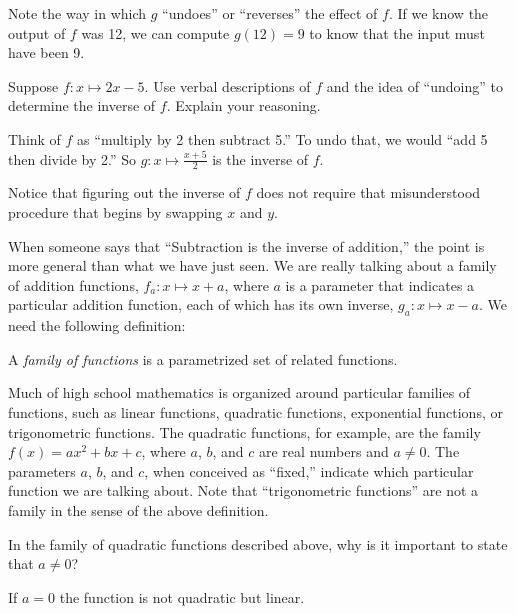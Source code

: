 \documentclass[space,handout,nooutcomes]{ximera}
\begin{document}
Note the way in which $g$ ``undoes'' or ``reverses'' the effect of $f$.  If we know the output of $f$ was 12, we can compute $g(12)=9$ to know that the input must have been 9.  

\begin{question}
Suppose $f:x\mapsto 2x-5$.  Use verbal descriptions of $f$ and the idea of ``undoing'' to determine the inverse of $f$.  Explain your reasoning.  
\begin{freeResponse}
\begin{hint}
Think of $f$ as ``multiply by 2 then subtract 5.'' To undo that, we would ``add 5 then divide by 2.''  So $g:x\mapsto \frac{x+5}{2}$ is the inverse of $f$.  
\end{hint}
\end{freeResponse}
\end{question}

\begin{remark}
Notice that figuring out the inverse of $f$ does not require that misunderstood procedure that begins by swapping $x$ and $y$.  
\end{remark}

When someone says that ``Subtraction is the inverse of addition,'' the point is more general than what we have just seen.  We are really talking about a family of addition functions, $f_a:x\mapsto x+a$, where $a$ is a parameter that indicates a particular addition function, each of which has its own inverse, $g_a:x\mapsto x-a$.  We need the following definition:  

\begin{definition}
A \emph{family of functions} is a parametrized set of related functions.  
\end{definition}

Much of high school mathematics is organized around particular families of functions, such as linear functions, quadratic functions, exponential functions, or trigonometric functions.  The quadratic functions, for example, are the family $f(x)=ax^2+bx+c$, where $a$, $b$, and $c$ are real numbers and $a\neq 0$.  The parameters $a$, $b$, and $c$, when conceived as ``fixed,'' indicate which particular function we are talking about.  Note that ``trigonometric functions'' are not a family in the sense of the above definition.  

\begin{question}
In the family of quadratic functions described above, why is it important to state that $a\neq 0$?
\begin{freeResponse}
\begin{hint}
If $a=0$ the function is not quadratic but linear.
\end{hint}
\end{freeResponse}
\end{question}
\end{document}
